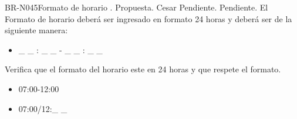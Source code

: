 \begin{BusinessRule}{BR-N045}{Formato de horario}
	{\bcCondition}    %
	{\btEnabler}     %
	{\blControlling}    %
	.
	\BRItem[Estado] Propuesta.
	 Cesar
	 Pendiente.
	 Pendiente.
	\BRItem[Descripción] El Formato de horario deberá ser ingresado en formato 24 horas y deberá ser de la siguiente manera:
		\begin{itemize}
			\item  \_ \_ : \_ \_ - \_ \_ : \_ \_
		\end{itemize}
		\BRItem[Motivación] Verifica que el formato del horario este en 24 horas y que respete el formato.
		 \cdtEmpty
		\begin{itemize}
			\item 07:00-12:00
		\end{itemize}
		 \cdtEmpty
		\begin{itemize}
			\item 07:00/12:\_ \_
		\end{itemize}
\end{BusinessRule}

